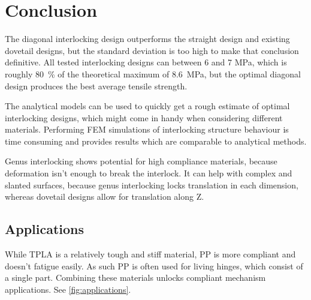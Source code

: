 \section{Conclusion}
The diagonal interlocking design outperforms the straight design and existing dovetail designs,
but the standard deviation is too high to make that conclusion definitive.
All tested interlocking designs can between 6 and 7 \si{\mega\pascal}, which is roughly \SI{80}{\percent} of the theoretical maximum of \SI{8.6}{\mega\pascal},
but the optimal diagonal design produces the best average tensile strength.

The analytical models can be used to quickly get a rough estimate of optimal interlocking designs,
which might come in handy when considering different materials.
Performing FEM simulations of interlocking structure behaviour is time consuming and provides results which are comparable to analytical methods.

Genus interlocking shows potential for high compliance materials, because deformation isn't enough to break the interlock.
It can help with complex and slanted surfaces, because genus interlocking locks translation in each dimension, 
whereas dovetail designs allow for translation along Z.



\subsection{Applications}
While TPLA is a relatively tough and stiff material, PP is more compliant and doesn't fatigue easily.
As such PP is often used for living hinges, which consist of a single part.
Combining these materials unlocks compliant mechanism applications.
See \cref{fig:applications}.



